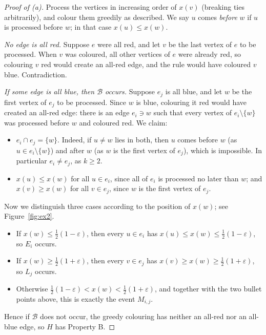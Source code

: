 \documentclass[a4paper,12pt]{article}
\newcommand{\eps}{\varepsilon}
\begin{document}
\begin{proof}[Proof of (a)]
	Process the vertices in increasing order of $x(v)$ (breaking ties arbitrarily), and colour them greedily as described. We say $u$ comes \emph{before} $w$ if $u$ is processed before $w$; in that case $x(u) \le x(w)$.

	\emph{No edge is all red.} Suppose $e$ were all red, and let $v$ be the last vertex of $e$ to be processed. When $v$ was coloured, all other vertices of $e$ were already red, so colouring $v$ red would create an all-red edge, and the rule would have coloured $v$ blue. Contradiction.

	\emph{If some edge is all blue, then $\mathcal{B}$ occurs.} Suppose $e_j$ is all blue, and let $w$ be the first vertex of $e_j$ to be processed. Since $w$ is blue, colouring it red would have created an all-red edge: there is an edge $e_i \ni w$ such that every vertex of $e_i \setminus \{w\}$ was processed before $w$ and coloured red. We claim:
	\begin{itemize}
		\item $e_i \cap e_j = \{w\}$. Indeed, if $u \ne w$ lies in both, then $u$ comes before $w$ (as $u \in e_i \setminus \{w\}$) and after $w$ (as $w$ is the first vertex of $e_j$), which is impossible. In particular $e_i \ne e_j$, as $k \ge 2$.
		\item $x(u) \le x(w)$ for all $u \in e_i$, since all of $e_i$ is processed no later than $w$; and $x(v) \ge x(w)$ for all $v \in e_j$, since $w$ is the first vertex of $e_j$.
	\end{itemize}
	Now we distinguish three cases according to the position of $x(w)$; see Figure~\ref{fig:ex2}.
	\begin{itemize}
		\item If $x(w) \le \frac12(1-\eps)$, then every $u \in e_i$ has $x(u) \le x(w) \le \frac12(1-\eps)$, so $E_i$ occurs.
		\item If $x(w) \ge \frac12(1+\eps)$, then every $v \in e_j$ has $x(v) \ge x(w) \ge \frac12(1+\eps)$, so $L_j$ occurs.
		\item Otherwise $\frac12(1-\eps) < x(w) < \frac12(1+\eps)$, and together with the two bullet points above, this is exactly the event $M_{i,j}$.
	\end{itemize}
	Hence if $\mathcal{B}$ does not occur, the greedy colouring has neither an all-red nor an all-blue edge, so $H$ has Property B.
\end{proof}
\end{document}
